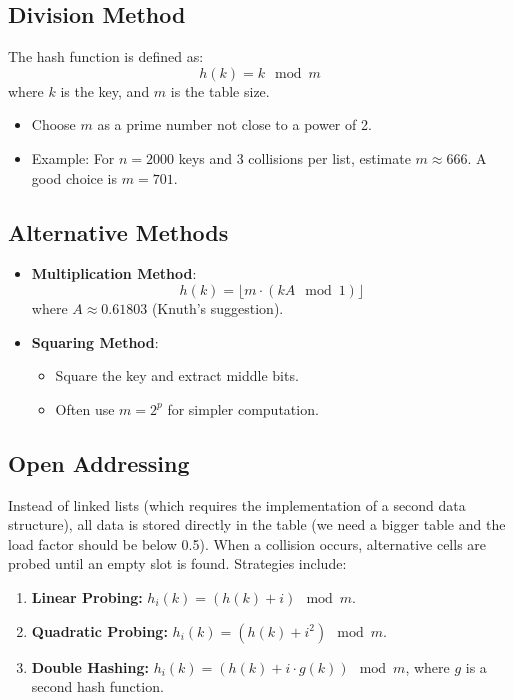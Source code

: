 \subsection*{Division Method}
The hash function is defined as:
\[
h(k) = k \mod m
\]
where \( k \) is the key, and \( m \) is the table size. 
\begin{itemize}
    \item Choose \( m \) as a prime number not close to a power of 2.
    \item Example: For \( n = 2000 \) keys and 3 collisions per list, estimate \( m \approx 666 \). A good choice is \( m = 701 \).
\end{itemize}

\subsection{Alternative Methods}
\begin{itemize}
    \item \textbf{Multiplication Method}:
    \[
    h(k) = \lfloor m \cdot (kA \mod 1) \rfloor
    \]
    where \( A \approx 0.61803 \) (Knuth's suggestion).
   \item \textbf{Squaring Method}:
    \begin{itemize}
        \item Square the key and extract middle bits.
        \item Often use \( m = 2^p \) for simpler computation.
    \end{itemize}

\end{itemize}







\subsection{Open Addressing}
Instead of linked lists (which requires the implementation of a second data structure), all data is stored directly in the table (we need a bigger table and the load factor should be below 0.5). When a collision occurs, alternative cells are probed until an empty slot is found.
Strategies include:
\begin{enumerate}
    \item \textbf{Linear Probing:} \( h_i(k) = (h(k) + i) \mod m \).
    \item \textbf{Quadratic Probing:} \( h_i(k) = (h(k) + i^2) \mod m \).
    \item \textbf{Double Hashing:} \( h_i(k) = (h(k) + i \cdot g(k)) \mod m \), where \( g \) is a second hash function.
\end{enumerate}

